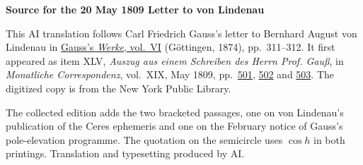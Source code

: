 \clearpage\thispagestyle{empty}
\begin{center}\textbf{Source for the 20 May 1809 Letter to von Lindenau}\end{center}
\noindent This AI translation follows Carl Friedrich Gauss’s letter to Bernhard August von Lindenau in \href{https://gdz.sub.uni-goettingen.de/id/PPN236007467}{Gauss’s \textit{Werke}, vol.~VI} (Göttingen, 1874), pp.~311--312. It first appeared as item XLV, \textit{Auszug aus einem Schreiben des Herrn Prof. Gauß}, in \textit{Monatliche Correspondenz}, vol.~XIX, May 1809, pp.~\href{https://archive.org/download/bub_gb_caMAAAAAMAAJ/page/n515.jpg}{501}, \href{https://archive.org/download/bub_gb_caMAAAAAMAAJ/page/n516.jpg}{502} and \href{https://archive.org/download/bub_gb_caMAAAAAMAAJ/page/n517.jpg}{503}. The digitized copy is from the New York Public Library.
\par\smallskip\noindent The collected edition adds the two bracketed passages, one on von Lindenau’s publication of the Ceres ephemeris and one on the February notice of Gauss’s pole-elevation programme. The quotation on the semicircle uses $\cos h$ in both printings. Translation and typesetting produced by AI.
\clearpage
